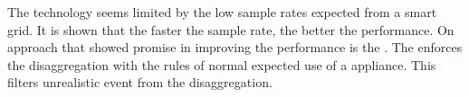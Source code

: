 The  technology seems limited by the low sample rates expected from a smart grid. It is shown that the faster the sample rate, the better the performance. On approach that showed  promise in improving the performance is the . The  enforces the disaggregation with the rules of normal expected use of a appliance. This filters unrealistic event from the disaggregation.